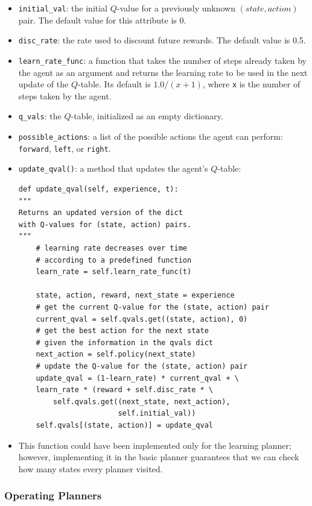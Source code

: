 \documentclass{article}
\begin{document}
\begin{itemize}
    \item \texttt{initial\_val}: the initial $Q$-value for a previously unknown $(state, action)$ pair. The default value for this attribute is 0.
    \item \texttt{disc\_rate}: the rate used to discount future rewards. The default value is 0.5.
    \item \texttt{learn\_rate\_func}: a function that takes the number of steps already taken by the agent as an argument and returns the learning rate to be used in the next update of the $Q$-table. Its default is $1.0 / (x + 1)$, where \texttt{x} is the number of steps taken by the agent.
    \item \texttt{q\_vals}: the $Q$-table, initialized as an empty dictionary.
    \item \texttt{possible\_actions}: a list of the possible actions the agent can perform: \texttt{forward}, \texttt{left}, or \texttt{right}.
    \newpage
    \item \texttt{update\_qval()}: a method that updates the agent's $Q$-table:
    \begin{verbatim}
def update_qval(self, experience, t):
"""
Returns an updated version of the dict
with Q-values for (state, action) pairs.
"""
    # learning rate decreases over time
    # according to a predefined function
    learn_rate = self.learn_rate_func(t)
    
    state, action, reward, next_state = experience
    # get the current Q-value for the (state, action) pair    
    current_qval = self.qvals.get((state, action), 0)
    # get the best action for the next state
    # given the information in the qvals dict
    next_action = self.policy(next_state)
    # update the Q-value for the (state, action) pair    
    update_qval = (1-learn_rate) * current_qval + \
    learn_rate * (reward + self.disc_rate * \
        self.qvals.get((next_state, next_action), 
                       self.initial_val))
    self.qvals[(state, action)] = update_qval\end{verbatim}
    \item[] This function could have been implemented only for the learning planner; however, implementing it in the basic planner guarantees that we can check how many states every planner visited.
\end{itemize}

\subsubsection{Operating Planners}
\end{document}

